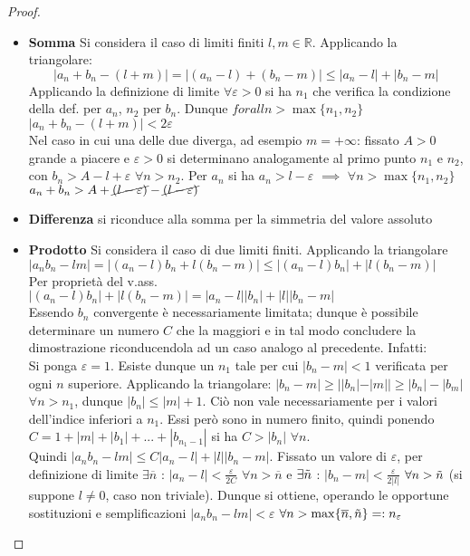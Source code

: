 \documentclass[10pt]{article}
\theoremstyle{plain}
\begin{document}
\begin{proof}
\begin{itemize}
    \item \textbf{Somma} Si considera il caso di limiti finiti $l, m \in \mathbb{R}$. Applicando la triangolare:
    \[|a_n + b_n - (l+m)| = |(a_n - l) + (b_n - m)| \leq |a_n - l| + |b_n - m|\]
    Applicando la definizione di limite $\forall \varepsilon > 0$ si ha $n_1$ che verifica la condizione della def. per $a_n$, $n_2$ per $b_n$. Dunque $forall n > \max\{n_1, n_2\}$ $|a_n + b_n - (l+m)| < 2\varepsilon$
    \\Nel caso in cui una delle due diverga, ad esempio $m = +\infty$: fissato $A>0$ grande a piacere e $\varepsilon >0$ si determinano analogamente al primo punto $n_1$ e $n_2$, con $b_n > A - l + \varepsilon$ $\forall n > n_2$. Per $a_n$ si ha $a_n > l - \varepsilon$ $\implies$ $\forall n > \max\{n_1, n_2\}$ $a_n + b_n > A + \cancel{(l - \varepsilon)} - \cancel{(l - \varepsilon)}$
    \item \textbf{Differenza} si riconduce alla somma per la simmetria del valore assoluto
    \item \textbf{Prodotto} Si considera il caso di due limiti finiti. Applicando la triangolare
    $|a_n b_n - l m| = |(a_n - l) b_n + l (b_n - m)| \leq |(a_n - l) b_n| + |l (b_n - m)|$
    \\Per proprietà del v.ass. $|(a_n - l) b_n| + |l (b_n - m)| = |a_n - l||b_n| + |l||b_n - m|$
    \\Essendo $b_n$ convergente è necessariamente limitata; dunque è possibile determinare un numero $C$ che la maggiori e in tal modo concludere la dimostrazione riconducendola ad un caso analogo al precedente. Infatti:
    \\Si ponga $\varepsilon = 1$. Esiste dunque un $n_1$ tale per cui $|b_n -m| < 1$ verificata per ogni $n$ superiore. Applicando la triangolare: $|b_n - m| \geq ||b_n| - |m|| \geq |b_n| - |b_m|$ $\forall n > n_1$, dunque $|b_n| \leq |m| + 1$. Ciò non vale necessariamente per i valori dell'indice inferiori a $n_1$. Essi però sono in numero finito, quindi ponendo $C = 1 + |m| + |b_1| + ... + |b_{n_1-1}|$ si ha $C > |b_n|$ $\forall n$.
    \\Quindi $|a_n b_n - l m| \leq C |a_n - l| + |l| |b_n - m|$. Fissato un valore di $\varepsilon$, per definizione di limite $\exists \overline{n}$ : $|a_n - l| < \frac{\varepsilon}{2C}$ $\forall n > \overline{n}$ e $\exists \Tilde{n}$ : $|b_n - m| < \frac{\varepsilon}{2|l|}$ $\forall n > \Tilde{n}$ (si suppone $l \neq 0$, caso non triviale). Dunque si ottiene, operando le opportune sostituzioni e semplificazioni $|a_n b_n - l m| < \varepsilon$ $\forall n > \max \{\overline{n}, \Tilde{n}\} =: n_\varepsilon$

\end{itemize}
\end{proof}
\end{document}
